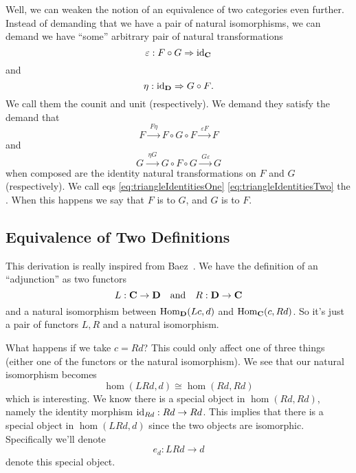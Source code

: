 Well, we can weaken the notion of an equivalence of two
categories even further. Instead of demanding that we have a
pair of natural isomorphisms, we can demand we have ``some''
arbitrary pair of natural transformations
\begin{equation}%
\varepsilon:F\circ{G}\Rightarrow{\id{\ms{C}}}
\end{equation}
and
\begin{equation}%
\eta:\id{\ms{D}}\Rightarrow{G\circ{F}}.
\end{equation}
We call them the counit and unit (respectively). We demand they
satisfy the demand that
\begin{equation}\label{eq:triangleIdentitiesOne}
F\xrightarrow{\;F\eta\;}F\circ{G\circ{F}}\xrightarrow{\;\varepsilon F\,}F
\end{equation}
and
\begin{equation}\label{eq:triangleIdentitiesTwo}
G\xrightarrow{\;\eta G\;}G\circ{F\circ{G}}\xrightarrow{\;G \varepsilon\,}G
\end{equation}
when composed are the identity natural transformations on $F$ and
$G$ (respectively). We call eqs \eqref{eq:triangleIdentitiesOne}
\eqref{eq:triangleIdentitiesTwo} the .
When this happens we say that $F$ is  to
$G$, and $G$ is  to $F$.

\subsection{Equivalence of Two Definitions}
This derivation is really inspired from
Baez~\cite{BaezWeek79}. We have
the definition of an ``adjunction'' as two functors
\begin{equation}
L:\mathbf{C}\to\mathbf{D}\quad\text{and}\quad{}R:\mathbf{D}\to\mathbf{C}
\end{equation}
and a natural isomorphism between $\operatorname{Hom}_{\mathbf{D}}(Lc,d)$ and
$\operatorname{Hom}_{\mathbf{C}}(c,Rd)$. So it's just a pair of functors $L,R$ and
a natural isomorphism.

What happens if we take $c=Rd$? This could only affect one of
three things (either one of the functors or the natural
isomorphism). We see that our natural isomorphism becomes
\begin{equation}
\hom(LRd,d)\cong\hom(Rd,Rd)
\end{equation}
which is interesting. We know there is a special object in
$\hom(Rd,Rd)$, namely the identity morphism
$\operatorname{id}_{Rd}:Rd\to{}Rd$. This implies that there is a special object
in $\hom(LRd,d)$ since the two objects are
isomorphic. Specifically we'll denote
\begin{equation}
e_{d}:LRd\to d
\end{equation}
denote this special object.

